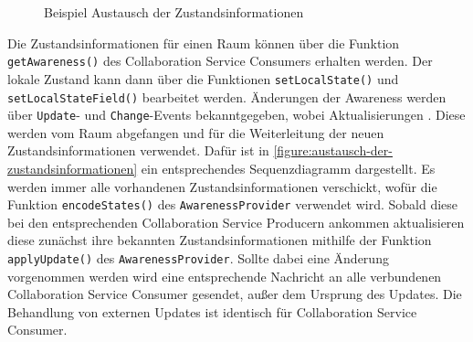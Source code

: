 \begin{figure}[tbp]
    \centering

    \caption{Beispiel Austausch der Zustandsinformationen}
    \label{figure:austausch-der-zustandsinformationen}
\end{figure}

Die Zustandsinformationen für einen Raum können über die Funktion \texttt{getAwareness()} des Collaboration Service Consumers erhalten werden. Der lokale Zustand kann dann über die Funktionen \texttt{setLocalState()} und \texttt{setLocalStateField()} bearbeitet werden. Änderungen der Awareness werden über \texttt{Update}- und \texttt{Change}-Events bekanntgegeben, wobei Aktualisierungen . Diese werden vom Raum abgefangen und für die Weiterleitung der neuen Zustandsinformationen verwendet. Dafür ist in \autoref{figure:austausch-der-zustandsinformationen} ein entsprechendes Sequenzdiagramm dargestellt. Es werden immer alle vorhandenen Zustandsinformationen verschickt, wofür die Funktion \texttt{encodeStates()} des \texttt{AwarenessProvider} verwendet wird. Sobald diese bei den entsprechenden Collaboration Service Producern ankommen aktualisieren diese zunächst ihre bekannten Zustandsinformationen mithilfe der Funktion \texttt{applyUpdate()} des \texttt{AwarenessProvider}. Sollte dabei eine Änderung vorgenommen werden wird eine entsprechende Nachricht an alle verbundenen Collaboration Service Consumer gesendet, außer dem Ursprung des Updates. Die Behandlung von externen Updates ist identisch für Collaboration Service Consumer.

